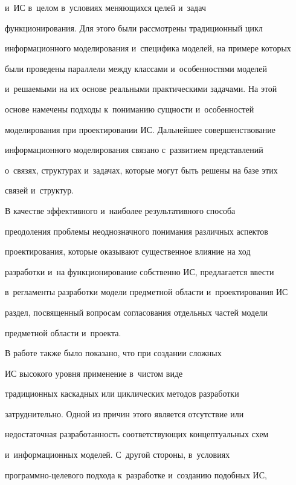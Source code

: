 и~ИС в~целом в~условиях меняющихся целей и~задач 


функционирования. Для этого были рассмотрены традиционный цикл 


информационного моделирования и~специфика моделей, на примере которых 


были проведены параллели между классами и~особенностями моделей 


и~решаемыми на их основе реальными практическими задачами. На этой 


основе намечены подходы к~пониманию сущности и~особенностей 


моделирования при проектировании ИС. Дальнейшее совершенствование 


информационного моделирования связано с~развитием представлений 


о~связях, структурах и~задачах, которые могут быть решены на базе этих 


связей и~структур.


    


    В качестве эффективного и~наиболее результативного способа 


преодоления проблемы неоднозначного понимания различных аспектов 


проектирования, которые оказывают существенное влияние на ход 


разработки и~на функционирование собственно ИС, предлагается ввести 


в~регламенты разработки модели предметной области и~проектирования ИС 


раздел, посвященный вопросам согласования отдельных частей модели 


предметной области и~проекта. 


    


    В работе также было показано, что при создании сложных 


ИС высокого уровня применение в~чистом виде 


традиционных каскадных или циклических методов разработки 


затруднительно. Одной из причин этого является отсутствие или 


недостаточная разработанность соответствующих концептуальных схем 


и~информационных моделей. С~другой стороны, в~условиях  


про\-граммно-це\-ле\-во\-го подхода к~разработке и~созданию подобных ИС, 


